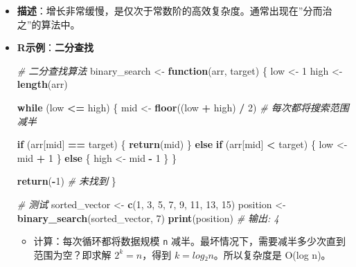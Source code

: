 \documentclass[
]{book}
\newenvironment{Shaded}{\begin{snugshade}}{\end{snugshade}}
\newcommand{\CommentTok}[1]{\textcolor[rgb]{0.56,0.35,0.01}{\textit{#1}}}
\newcommand{\ControlFlowTok}[1]{\textcolor[rgb]{0.13,0.29,0.53}{\textbf{#1}}}
\newcommand{\DecValTok}[1]{\textcolor[rgb]{0.00,0.00,0.81}{#1}}
\newcommand{\FunctionTok}[1]{\textcolor[rgb]{0.13,0.29,0.53}{\textbf{#1}}}
\newcommand{\NormalTok}[1]{#1}
\newcommand{\OtherTok}[1]{\textcolor[rgb]{0.56,0.35,0.01}{#1}}
\newcommand{\SpecialCharTok}[1]{\textcolor[rgb]{0.81,0.36,0.00}{\textbf{#1}}}
\providecommand{\tightlist}{%
  \setlength{\itemsep}{0pt}\setlength{\parskip}{0pt}}
\begin{document}
\begin{itemize}
\item
  \textbf{描述}：增长非常缓慢，是仅次于常数阶的高效复杂度。通常出现在''分而治之''的算法中。
\item
  \textbf{R示例}：\textbf{二分查找}

\begin{Shaded}
\begin{Highlighting}[]
\CommentTok{\# 二分查找算法}
\NormalTok{binary\_search }\OtherTok{\textless{}{-}} \ControlFlowTok{function}\NormalTok{(arr, target) \{}
\NormalTok{  low }\OtherTok{\textless{}{-}} \DecValTok{1}
\NormalTok{  high }\OtherTok{\textless{}{-}} \FunctionTok{length}\NormalTok{(arr)}

  \ControlFlowTok{while}\NormalTok{ (low }\SpecialCharTok{\textless{}=}\NormalTok{ high) \{}
\NormalTok{    mid }\OtherTok{\textless{}{-}} \FunctionTok{floor}\NormalTok{((low }\SpecialCharTok{+}\NormalTok{ high) }\SpecialCharTok{/} \DecValTok{2}\NormalTok{)  }\CommentTok{\# 每次都将搜索范围减半}

    \ControlFlowTok{if}\NormalTok{ (arr[mid] }\SpecialCharTok{==}\NormalTok{ target) \{}
      \FunctionTok{return}\NormalTok{(mid)}
\NormalTok{    \} }\ControlFlowTok{else} \ControlFlowTok{if}\NormalTok{ (arr[mid] }\SpecialCharTok{\textless{}}\NormalTok{ target) \{}
\NormalTok{      low }\OtherTok{\textless{}{-}}\NormalTok{ mid }\SpecialCharTok{+} \DecValTok{1}
\NormalTok{    \} }\ControlFlowTok{else}\NormalTok{ \{}
\NormalTok{      high }\OtherTok{\textless{}{-}}\NormalTok{ mid }\SpecialCharTok{{-}} \DecValTok{1}
\NormalTok{    \}}
\NormalTok{  \}}

  \FunctionTok{return}\NormalTok{(}\SpecialCharTok{{-}}\DecValTok{1}\NormalTok{)  }\CommentTok{\# 未找到}
\NormalTok{\}}

\CommentTok{\# 测试}
\NormalTok{sorted\_vector }\OtherTok{\textless{}{-}} \FunctionTok{c}\NormalTok{(}\DecValTok{1}\NormalTok{, }\DecValTok{3}\NormalTok{, }\DecValTok{5}\NormalTok{, }\DecValTok{7}\NormalTok{, }\DecValTok{9}\NormalTok{, }\DecValTok{11}\NormalTok{, }\DecValTok{13}\NormalTok{, }\DecValTok{15}\NormalTok{)}
\NormalTok{position }\OtherTok{\textless{}{-}} \FunctionTok{binary\_search}\NormalTok{(sorted\_vector, }\DecValTok{7}\NormalTok{)}
\FunctionTok{print}\NormalTok{(position)  }\CommentTok{\# 输出: 4}
\end{Highlighting}
\end{Shaded}

  \begin{itemize}
  \tightlist
  \item
    计算：每次循环都将数据规模 \texttt{n} 减半。最坏情况下，需要减半多少次直到范围为空？即求解 \(2^k = n\)，得到 \(k = log₂n\)。所以复杂度是 O(log n)。
  \end{itemize}
\end{itemize}
\end{document}
